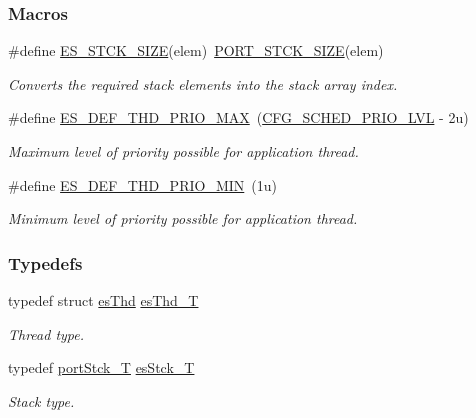 \subsubsection*{Macros}
\begin{DoxyCompactItemize}
\item 
\#define \hyperlink{group__kern__thd_gaa707debebe3f98439911212b0cc8b3d1}{E\-S\-\_\-\-S\-T\-C\-K\-\_\-\-S\-I\-Z\-E}(elem)~\hyperlink{group__template__cpu__intf_gacb3a46e89d327fbaf5c122fe23877b24}{P\-O\-R\-T\-\_\-\-S\-T\-C\-K\-\_\-\-S\-I\-Z\-E}(elem)
\begin{DoxyCompactList}\small\item\em Converts the required stack elements into the stack array index. \end{DoxyCompactList}\item 
\#define \hyperlink{group__kern__thd_gaa9562c0ae61ad207e40486f952c5c7b3}{E\-S\-\_\-\-D\-E\-F\-\_\-\-T\-H\-D\-\_\-\-P\-R\-I\-O\-\_\-\-M\-A\-X}~(\hyperlink{group__template__kern__cfg_ga56bd89fe76f7fe22f3d8805bc3c68892}{C\-F\-G\-\_\-\-S\-C\-H\-E\-D\-\_\-\-P\-R\-I\-O\-\_\-\-L\-V\-L} -\/ 2u)
\begin{DoxyCompactList}\small\item\em Maximum level of priority possible for application thread. \end{DoxyCompactList}\item 
\#define \hyperlink{group__kern__thd_ga4dc54b2d44aa0656de70c7357733f4e4}{E\-S\-\_\-\-D\-E\-F\-\_\-\-T\-H\-D\-\_\-\-P\-R\-I\-O\-\_\-\-M\-I\-N}~(1u)
\begin{DoxyCompactList}\small\item\em Minimum level of priority possible for application thread. \end{DoxyCompactList}\end{DoxyCompactItemize}
\subsubsection*{Typedefs}
\begin{DoxyCompactItemize}
\item 
typedef struct \hyperlink{structesThd}{es\-Thd} \hyperlink{group__kern__thd_ga62e3a3ca0a4597a19c43cb8868810d82}{es\-Thd\-\_\-\-T}
\begin{DoxyCompactList}\small\item\em Thread type. \end{DoxyCompactList}\item 
typedef \hyperlink{group__template__cpu__intf_ga13cc91970e3e05fe4210440c068d3f4a}{port\-Stck\-\_\-\-T} \hyperlink{group__kern__thd_ga24160ddd0cb0327108cc652bfe6a49e5}{es\-Stck\-\_\-\-T}
\begin{DoxyCompactList}\small\item\em Stack type. \end{DoxyCompactList}\end{DoxyCompactItemize}
